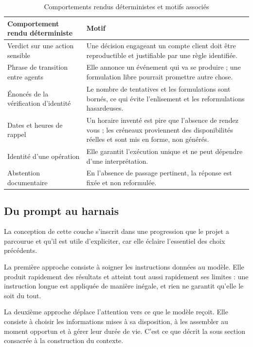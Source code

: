 \begin{table}[H]
\centering
\renewcommand{\arraystretch}{1.25}
\begin{tabular}{|p{5.2cm}|p{9.3cm}|}
\hline
\textbf{Comportement rendu déterministe} & \textbf{Motif} \\
\hline
Verdict sur une action sensible & Une décision engageant un compte client doit être reproductible et justifiable par une règle identifiée. \\
\hline
Phrase de transition entre agents & Elle annonce un événement qui va se produire ; une formulation libre pourrait promettre autre chose. \\
\hline
Énoncés de la vérification d'identité & Le nombre de tentatives et les formulations sont bornés, ce qui évite l'enlisement et les reformulations hasardeuses. \\
\hline
Dates et heures de rappel & Un horaire inventé est pire que l'absence de rendez vous ; les créneaux proviennent des disponibilités réelles et sont mis en forme, non générés. \\
\hline
Identité d'une opération & Elle garantit l'exécution unique et ne peut dépendre d'une interprétation. \\
\hline
Abstention documentaire & En l'absence de passage pertinent, la réponse est fixée et non reformulée. \\
\hline
\end{tabular}
\caption{Comportements rendus déterministes et motifs associés}
\label{tab:determinisme}
\end{table}

\subsection{Du prompt au harnais}

La conception de cette couche s'inscrit dans une progression que le projet a parcourue et qu'il est utile d'expliciter, car elle éclaire l'essentiel des choix précédents.

La première approche consiste à soigner les instructions données au modèle. Elle produit rapidement des résultats et atteint tout aussi rapidement ses limites : une instruction longue est appliquée de manière inégale, et rien ne garantit qu'elle le soit du tout.

La deuxième approche déplace l'attention vers ce que le modèle reçoit. Elle consiste à choisir les informations mises à sa disposition, à les assembler au moment opportun et à gérer leur durée de vie. C'est ce que décrit la sous section consacrée à la construction du contexte.

